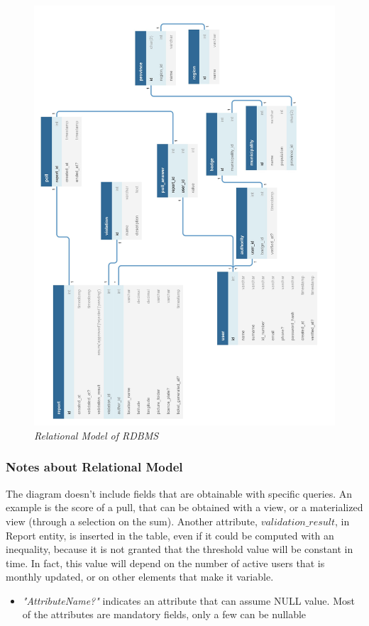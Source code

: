 \begin{figure}[H]
  \centering
  \includegraphics[origin=c,width=\textwidth]{DD_Images/RelationalModel/RelationalModel.jpg}
  \caption{\textit{Relational Model of RDBMS}}
\end{figure}

\subsubsection{Notes about Relational Model}
The diagram doesn't include fields that are obtainable with specific queries. An example is the score of a pull, that can be obtained 
with a view, or a materialized view (through a selection on the sum). Another attribute, $validation\_result$, in Report entity, is 
inserted in the table, even if it could be computed with an inequality, because it is not granted that the threshold value will be constant 
in time. In fact, this value will depend on the number of active users that is monthly updated, or on other elements that make it 
variable.
\begin{itemize}
  \item \textit{"AttributeName?"} indicates an attribute that can assume NULL value. Most of the attributes are mandatory fields, only a few 
  can be nullable 
\end{itemize}

